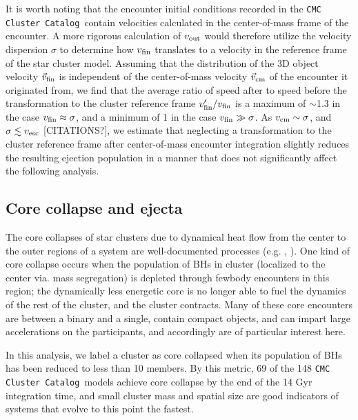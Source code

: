 \documentclass[twocolumn]{aastex631}
\newcommand{\CMCcat}{\texttt{CMC Cluster Catalog}}
\begin{document}
It is worth noting that the encounter initial conditions recorded in the \CMCcat\ contain velocities calculated in the center-of-mass frame of the encounter.
A more rigorous calculation of $v_{\rm out}$ would therefore utilize the velocity dispersion $\sigma$ to determine how $v_{\rm fin}$ translates to a velocity in the reference frame of the star cluster model.
Assuming that the distribution of the 3D object velocity $\vec{v}_{\rm fin}$ is independent of the center-of-mass velocity $\vec{v}_{\rm cm}$ of the encounter it originated from, we find that the average ratio of speed after to speed before the transformation to the cluster reference frame $v'_{\rm fin} / v_{\rm fin}$ is a maximum of $\sim$1.3 in the case $v_{\rm fin} \approx \sigma$, and a minimum of 1 in the case $v_{\rm fin} \gg \sigma$.
As $v_{\rm cm} \sim \sigma$, and $\sigma \lesssim v_{\rm esc}$ [CITATIONS?], we estimate that neglecting a transformation to the cluster reference frame after center-of-mass encounter integration slightly reduces the resulting ejection population in a manner that does not significantly affect the following analysis.

\subsection{Core collapse and ejecta} \label{subsec:cc}

The core collapses of star clusters due to dynamical heat flow from the center to the outer regions of a system are well-documented processes (e.g. \citealt{1968MNRAS.138..495L}, \citealt{2020IAUS..351..357K}).
One kind of core collapse occurs when the population of BHs in cluster (localized to the center via. mass segregation) is depleted through fewbody encounters in this region; the dynamically less energetic core is no longer able to fuel the dynamics of the rest of the cluster, and the cluster contracts.
Many of these core encounters are between a binary and a single, contain compact objects, and can impart large accelerations on the participants, and accordingly are of particular interest here.

In this analysis, we label a cluster as core collapsed when its population of BHs has been reduced to less than 10 members.
By this metric, 69 of the 148 \CMCcat\ models achieve core collapse by the end of the 14 Gyr integration time, and small cluster mass and spatial size are good indicators of systems that evolve to this point the fastest.
\end{document}
